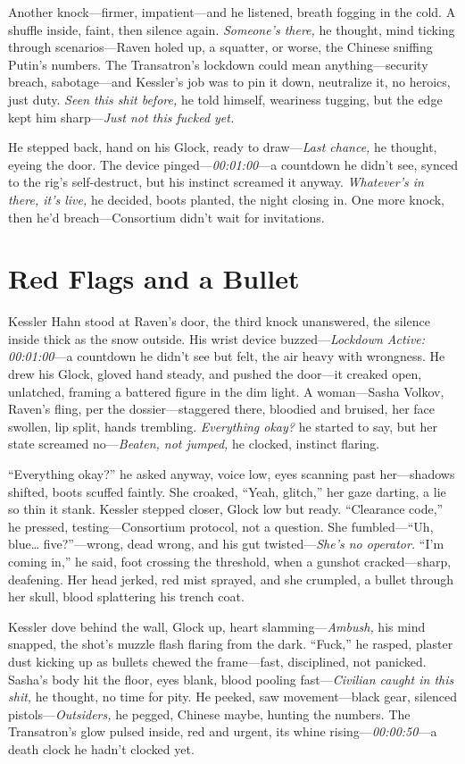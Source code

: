 \documentclass[12pt]{book}
\begin{document}
Another knock—firmer, impatient—and he listened, breath fogging in the cold. A shuffle inside, faint, then silence again. \textit{Someone’s there,} he thought, mind ticking through scenarios—Raven holed up, a squatter, or worse, the Chinese sniffing Putin’s numbers. The Transatron’s lockdown could mean anything—security breach, sabotage—and Kessler’s job was to pin it down, neutralize it, no heroics, just duty. \textit{Seen this shit before,} he told himself, weariness tugging, but the edge kept him sharp—\textit{Just not this fucked yet.}

He stepped back, hand on his Glock, ready to draw—\textit{Last chance,} he thought, eyeing the door. The device pinged—\textit{00:01:00}—a countdown he didn’t see, synced to the rig’s self-destruct, but his instinct screamed it anyway. \textit{Whatever’s in there, it’s live,} he decided, boots planted, the night closing in. One more knock, then he’d breach—Consortium didn’t wait for invitations.

\section{Red Flags and a Bullet}

Kessler Hahn stood at Raven’s door, the third knock unanswered, the silence inside thick as the snow outside. His wrist device buzzed—\textit{Lockdown Active: 00:01:00}—a countdown he didn’t see but felt, the air heavy with wrongness. He drew his Glock, gloved hand steady, and pushed the door—it creaked open, unlatched, framing a battered figure in the dim light. A woman—Sasha Volkov, Raven’s fling, per the dossier—staggered there, bloodied and bruised, her face swollen, lip split, hands trembling. \textit{Everything okay?} he started to say, but her state screamed no—\textit{Beaten, not jumped,} he clocked, instinct flaring.

“Everything okay?” he asked anyway, voice low, eyes scanning past her—shadows shifted, boots scuffed faintly. She croaked, “Yeah, glitch,” her gaze darting, a lie so thin it stank. Kessler stepped closer, Glock low but ready. “Clearance code,” he pressed, testing—Consortium protocol, not a question. She fumbled—“Uh, blue… five?”—wrong, dead wrong, and his gut twisted—\textit{She’s no operator.} “I’m coming in,” he said, foot crossing the threshold, when a gunshot cracked—sharp, deafening. Her head jerked, red mist sprayed, and she crumpled, a bullet through her skull, blood splattering his trench coat.

Kessler dove behind the wall, Glock up, heart slamming—\textit{Ambush,} his mind snapped, the shot’s muzzle flash flaring from the dark. “Fuck,” he rasped, plaster dust kicking up as bullets chewed the frame—fast, disciplined, not panicked. Sasha’s body hit the floor, eyes blank, blood pooling fast—\textit{Civilian caught in this shit,} he thought, no time for pity. He peeked, saw movement—black gear, silenced pistols—\textit{Outsiders,} he pegged, Chinese maybe, hunting the numbers. The Transatron’s glow pulsed inside, red and urgent, its whine rising—\textit{00:00:50}—a death clock he hadn’t clocked yet.
\end{document}
